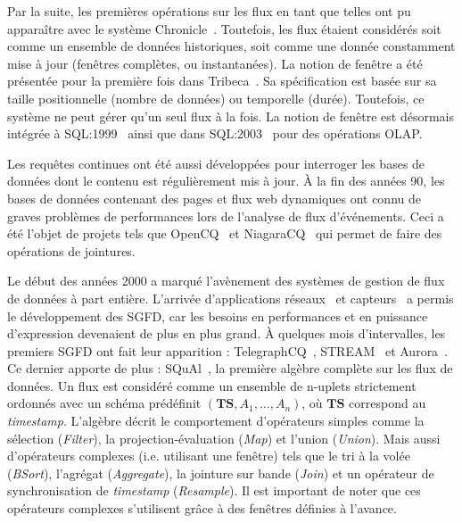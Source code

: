 Par la suite, les premières opérations sur les flux en tant que telles ont pu apparaître avec le système Chronicle~\cite{Jagadish:chronicle}. Toutefois, les flux étaient considérés soit comme un ensemble de données historiques, soit comme une donnée constamment mise à jour (fenêtres complètes, ou instantanées). La notion de fenêtre a été présentée pour la première fois dans Tribeca~\cite{Sullivan:tribeca,Sullivan:tribeca2}. Sa spécification est basée sur sa taille positionnelle (nombre de données) ou temporelle (durée). Toutefois, ce système ne peut gérer qu'un seul flux à la fois. La notion de fenêtre est désormais intégrée à SQL:1999~\cite{Melton:sql1999} ainsi que dans SQL:2003~\cite{Eisenberg:sql2003} pour des opérations OLAP.

Les requêtes continues ont été aussi développées pour interroger les bases de données dont le contenu est régulièrement mis à jour. À la fin des années 90, les bases de données contenant des pages et flux web dynamiques ont connu de graves problèmes de performances lors de l'analyse de flux d'événements. Ceci a été l'objet de projets tels que OpenCQ~\cite{Liu:opencq} et NiagaraCQ~\cite{Chen:niagaracq} qui permet de faire des opérations de jointures.

Le début des années 2000 a marqué l'avènement des systèmes de gestion de flux de données à part entière. L'arrivée d'applications réseaux~\cite{Cranor:gigascope} et capteurs~\cite{Madden:tag,Yao:cougar} a permis le développement des SGFD, car les besoins en performances et en puissance d'expression devenaient de plus en plus grand. À quelques mois d'intervalles, les premiers SGFD ont fait leur apparition : TelegraphCQ~\cite{Chandrasekaran:telegraphcq}, STREAM~\cite{Widom:queries} et Aurora~\cite{Carney:monitoring}. Ce dernier apporte de plus : SQuAl~\cite{Abadi:aurora}, la première algèbre complète sur les flux de données. Un flux est considéré comme un ensemble de n-uplets strictement ordonnés avec un schéma prédéfinit $(\textbf{TS}, A_1,\dots, A_n)$, où $\textbf{TS}$ correspond au \textit{timestamp}. L'algèbre décrit le comportement d'opérateurs simples comme la sélection (\textit{Filter}), la projection-évaluation (\textit{Map}) et l'union (\textit{Union}). Mais aussi d'opérateurs complexes (i.e. utilisant une fenêtre) tels que le tri à la volée (\textit{BSort}), l'agrégat (\textit{Aggregate}), la jointure sur bande (\textit{Join}) et un opérateur de synchronisation de \textit{timestamp} (\textit{Resample}). Il est important de noter que ces opérateurs complexes s'utilisent grâce à des fenêtres définies à l'avance.

